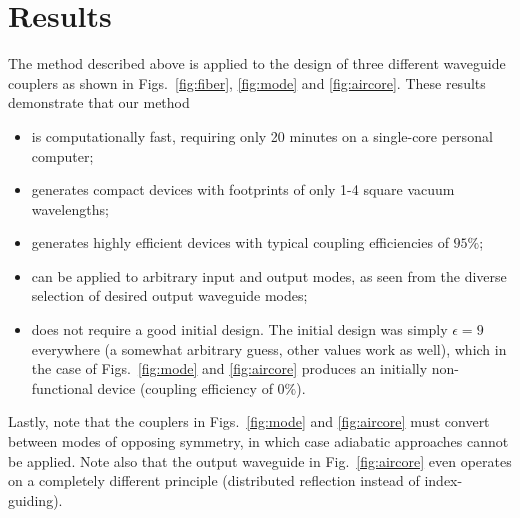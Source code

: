 \documentclass[letterpaper,10pt]{article}
\begin{document}
\section{Results}
The method described above is applied to 
    the design of three different waveguide couplers
    as shown in Figs.~\ref{fig:fiber}, \ref{fig:mode} and \ref{fig:aircore}.
These results demonstrate that our method
    \begin{itemize}
    \item is computationally fast, 
        requiring only 20 minutes on a single-core personal computer;
    \item generates compact devices with footprints of only
        1-4 square vacuum wavelengths;
    \item generates highly efficient devices with  
        typical coupling efficiencies of $95\%$;
    \item can be applied to arbitrary input and output modes,
        as seen from the diverse selection of desired output waveguide modes;
    \item does not require a good initial design.
        The initial design was simply $\epsilon = 9$ everywhere
            (a somewhat arbitrary guess, other values work as well),
            which in the case of Figs.~\ref{fig:mode} and \ref{fig:aircore}
            produces an initially non-functional device 
            (coupling efficiency of $0\%$).

    \end{itemize}

Lastly, note that the couplers in Figs.~\ref{fig:mode} and \ref{fig:aircore}
    must convert between modes of opposing symmetry,
    in which case adiabatic approaches cannot be applied.
Note also that the output waveguide in Fig.~\ref{fig:aircore}
    even operates on a completely different principle 
    (distributed reflection instead of index-guiding).
\end{document}

